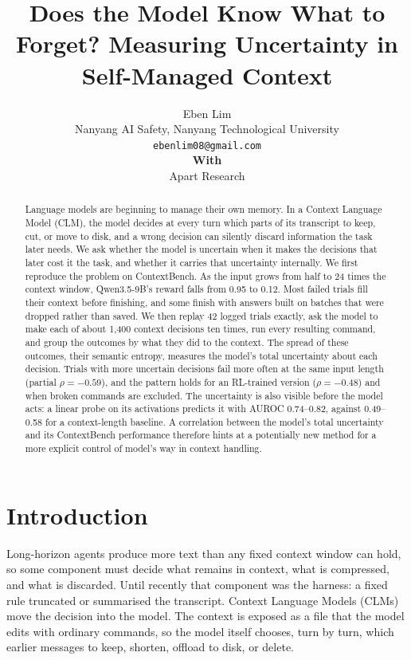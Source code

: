 \documentclass{article}
\title{Does the Model Know What to Forget? Measuring Uncertainty in Self-Managed Context}
\author{%
  Eben Lim\\
  Nanyang AI Safety, Nanyang Technological University\\
  \texttt{ebenlim08@gmail.com}\\[8pt]
  \textbf{With}\\
  Apart Research
}
\begin{document}
\maketitle
\vspace{-0.2in}

\begin{abstract}
  Language models are beginning to manage their own memory.
  In a Context Language Model (CLM), the model decides at every turn which parts of its transcript to keep, cut, or move to disk, and a wrong decision can silently discard information the task later needs.
  We ask whether the model is uncertain when it makes the decisions that later cost it the task, and whether it carries that uncertainty internally.
  We first reproduce the problem on ContextBench.
  As the input grows from half to 24 times the context window, Qwen3.5-9B's reward falls from 0.95 to 0.12.
  Most failed trials fill their context before finishing, and some finish with answers built on batches that were dropped rather than saved.
  We then replay 42 logged trials exactly, ask the model to make each of about 1{,}400 context decisions ten times, run every resulting command, and group the outcomes by what they did to the context.
  The spread of these outcomes, their semantic entropy, measures the model's total uncertainty about each decision.
  Trials with more uncertain decisions fail more often at the same input length (partial $\rho=-0.59$), and the pattern holds for an RL-trained version ($\rho=-0.48$) and when broken commands are excluded.
  The uncertainty is also visible before the model acts: a linear probe on its activations predicts it with AUROC 0.74--0.82, against 0.49--0.58 for a context-length baseline.
  A correlation between the model's total uncertainty and its ContextBench performance therefore hints at a potentially new method
  for a more explicit control of model's way in context handling.
\end{abstract}

\section{Introduction}

Long-horizon agents produce more text than any fixed context window can hold, so some component must decide what remains in context, what is compressed, and what is discarded.
Until recently that component was the harness: a fixed rule truncated or summarised the transcript.
Context Language Models (CLMs) \citep{shao2026clm} move the decision into the model.
The context is exposed as a file that the model edits with ordinary commands, so the model itself chooses, turn by turn, which earlier messages to keep, shorten, offload to disk, or delete.
\end{document}
